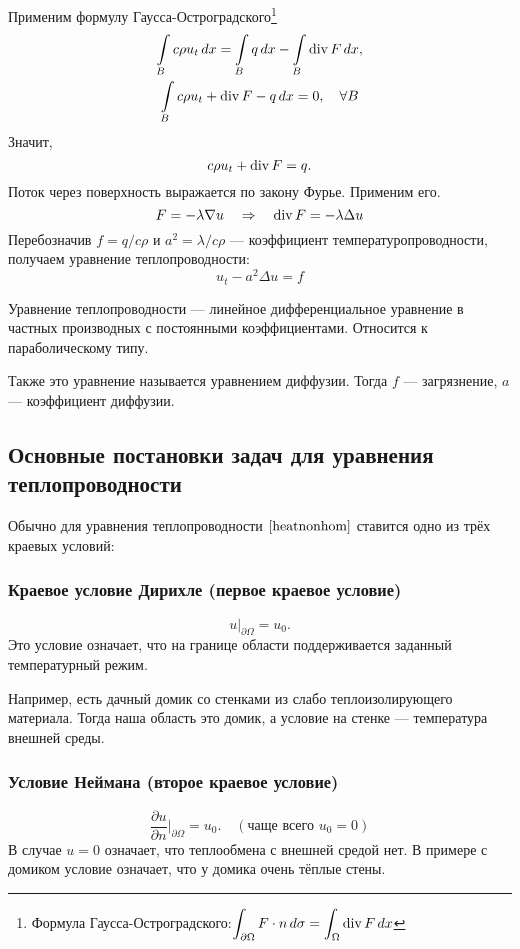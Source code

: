 Применим формулу Гаусса-Остроградского\footnote{Формула Гаусса-Остроградского:$
    \displaystyle \int_{\partial \Omega} F \cdot n \, d\sigma = \displaystyle \int_{\Omega} \operatorname{div} F \, dx$}
\begin{gather*}
    \int \limits_B c \rho u_t \, dx = \int \limits_B q \, dx - \int \limits_B \operatorname{div} F \, dx, \\
    \int \limits_B c \rho u_t + \operatorname{div} F - q \, dx = 0,\quad \forall B
\end{gather*}
Значит,
$$ c \rho u_t + \operatorname{div} F = q.$$
Поток через поверхность выражается по закону Фурье. Применим его.
$$ F = - \lambda \nabla u \quad \Rightarrow \quad \operatorname{div} F = - \lambda \Delta u$$
Перебозначив $f = q/c\rho$ и $ a^2 = \lambda / c \rho $ --- коэффициент температуропроводности, получаем уравнение теплопроводности:
\begin{equation}
	u_t - a^2 \Delta u = f
\label{heatnonhom}
\end{equation}

Уравнение теплопроводности --- линейное дифференциальное уравнение в частных производных с постоянными коэффициентами. Относится к параболическому типу.

Также это уравнение называется уравнением диффузии. Тогда $f$ --- загрязнение, $a$ --- коэффициент диффузии.

\subsection{Основные постановки задач для уравнения теплопроводности}
Обычно для уравнения теплопроводности $\eqref{heatnonhom}$ ставится одно из трёх краевых условий:

\subsubsection{Краевое условие Дирихле (первое краевое условие)}
$$u \Bigg \rvert_{\partial\Omega} = u_0.$$
Это условие означает, что на границе области поддерживается заданный температурный режим.

Например, есть дачный домик со стенками из слабо теплоизолирующего материала. Тогда наша область это домик, а условие на стенке --- температура внешней среды.

\subsubsection{Условие Неймана (второе краевое условие)}
$$\dfrac{\partial u}{\partial n}\Bigg\rvert_{\partial\Omega} = u_0.\quad (\text{чаще всего }u_0 = 0)$$
В случае $u = 0$ означает, что теплообмена с внешней средой нет. В примере с домиком условие означает, что у домика очень тёплые стены.

